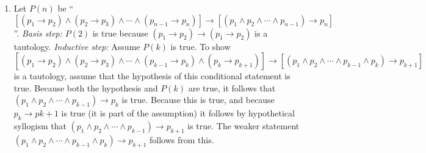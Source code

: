 \documentclass{../../cls/sig-alternate-05-2015}
\begin{document}
\begin{enumerate}
\item Let $P(n)$ be \textquotedblleft $[(p_1 \rightarrow p_2) \wedge (p_2 \rightarrow p_3) \wedge \cdots \wedge (p_{n - 1} \rightarrow p_n)] \rightarrow [(p_1 \wedge p_2 \wedge \cdots \wedge p_{n - 1}) \rightarrow p_n]$\textquotedblright . \textit{Basis step:} $P(2)$ is true because $(p_1 \rightarrow p_2) \rightarrow (p_1 \rightarrow p_2)$ is a tautology. \textit{Inductive step:} Assume $P(k)$ is true. To show $[(p_1 \rightarrow p_2) \wedge (p_2 \rightarrow p_3) \wedge \cdots \wedge (p_{k - 1} \rightarrow p_k) \wedge (p_k \rightarrow p_{k + 1})] \rightarrow [(p_1 \wedge p_2 \wedge \cdots \wedge p_{k - 1} \wedge p_k) \rightarrow p_{k + 1}]$ is a tautology, assume that the hypothesis of this conditional
statement is true. Because both the hypothesis and $P(k)$ are
true, it follows that $(p_1 \wedge p_2 \wedge \cdots \wedge p_{k - 1}) \rightarrow p_k$ is true. Because
this is true, and because $p_k \rightarrow p{k + 1}$ is true (it is part
of the assumption) it follows by hypothetical syllogism that
$(p_1 \wedge p_2 \wedge \cdots \wedge p_{k - 1}) \rightarrow p_{k + 1}$ is true. The weaker statement $(p_1 \wedge p_2 \wedge \cdots \wedge p_{k - 1} \wedge p_k) \rightarrow p_{k + 1}$ follows from this.
\end{enumerate}
\end{document}
